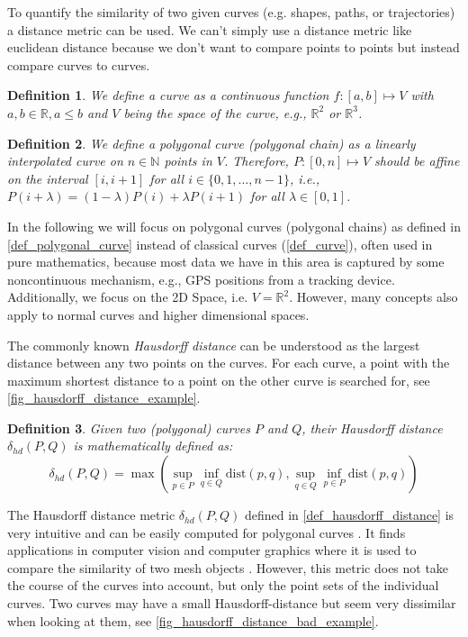 \documentclass[
oneside,
fontsize=11pt
]{scrartcl}
\newtheorem{mydef}{Definition}
\begin{document}
To quantify the similarity of two given curves (e.g. shapes, paths, or trajectories)
a distance metric can be used. 
We can't simply use a distance metric like euclidean distance 
because we don't want to compare points to points 
but instead compare curves to curves. 

\begin{mydef}
  \label{def_curve}
  We define a curve as a continuous function $f : [a,b] \mapsto V$ 
  with $a,b \in \mathbb{R}, a \leq b$ and $V$ being the space of the curve,
  e.g., $\mathbb{R}^2$ or $\mathbb{R}^3$.
\end{mydef}

\begin{mydef}
  \label{def_polygonal_curve}
  We define a polygonal curve (polygonal chain) 
  as a linearly interpolated curve 
  on $n \in \mathbb{N}$ points in $V$.
  Therefore, $P : [0,n] \mapsto V$ 
  should be affine on the interval $[i,i+1]$ for all $i \in \{0, 1, \dots, n-1\}$, 
  i.e., $P(i + \lambda) = (1 - \lambda)P(i) + \lambda P(i+1)$ for all $\lambda \in [0,1]$.
\end{mydef}

In the following we will focus on polygonal curves (polygonal chains) 
as defined in \autoref{def_polygonal_curve} 
instead of classical curves (\autoref{def_curve}), often used in pure mathematics, 
because most data we have in this area is 
captured by some noncontinuous mechanism, e.g., GPS positions from a tracking device.
Additionally, we focus on the 2D Space, i.e. $V = \mathbb{R}^2$.
However, many concepts also apply to normal curves and higher dimensional spaces.


The commonly known \textit{Hausdorff distance} can be understood 
as the largest distance between any two points on the curves. 
For each curve, a point with the maximum shortest distance to a point on the other curve is searched for, see \autoref{fig_hausdorff_distance_example}. \cite{alt_computing_1995}


\begin{mydef}
  \label{def_hausdorff_distance}
  Given two (polygonal) curves $P$ and $Q$, 
  their Hausdorff distance $\delta_{hd}(P,Q)$ is mathematically defined as: 
  $$\delta_{hd}(P,Q) = \max \left( \sup_{p \in P} \inf_{q \in Q} \text{dist}(p,q), \sup_{q \in Q} \inf_{p \in P} \text{dist}(p,q) \right)$$
\end{mydef}

The Hausdorff distance metric $\delta_{hd}(P,Q)$ defined in \autoref{def_hausdorff_distance} 
is very intuitive and can be easily computed for polygonal curves \cite{ko_complexity_2013}.
It finds applications in computer vision and computer graphics 
where it is used to compare the similarity of two mesh objects \cite{cignoni_metro_1998,ko_complexity_2013}. 
However, this metric does not take the course of the curves into account, 
but only the point sets of the individual curves.
Two curves may have a small Hausdorff-distance but seem very dissimilar 
when looking at them, see \autoref{fig_hausdorff_distance_bad_example}.
\end{document}
